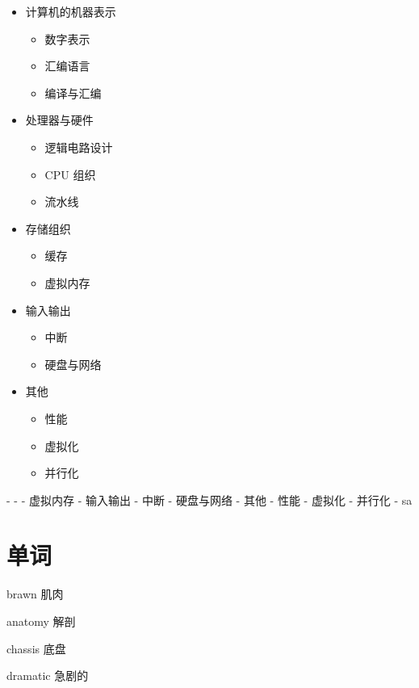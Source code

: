 \documentclass[cn,11pt,chinese,black,simple]{../elegantbook}
\begin{document}
\begin{markdown}

\begin{itemize}
    \item 计算机的机器表示
    \begin{itemize}
        \item 数字表示
        \item 汇编语言
        \item 编译与汇编    
    \end{itemize} 
    \item 处理器与硬件
    \begin{itemize}
        \item 逻辑电路设计
        \item  CPU 组织
        \item  流水线
    \end{itemize}
    \item 存储组织
    \begin{itemize}
        \item 缓存
        \item 虚拟内存
    \end{itemize}
    \item 输入输出
    \begin{itemize}
        \item 中断
        \item 硬盘与网络
    \end{itemize}
    \item 其他
    \begin{itemize}
        \item 性能
        \item 虚拟化
        \item 并行化
    \end{itemize}
\end{itemize}

- 
    - 
    - 虚拟内存
- 输入输出
    - 中断
    - 硬盘与网络
- 其他
    - 性能
    - 虚拟化
    - 并行化
        - sa
\end{markdown}

\section*{单词}

brawn 肌肉

anatomy 解剖

chassis 底盘

dramatic 急剧的

\let\chapname\undefined
\ifx\mainclass\undefined
\end{document}
